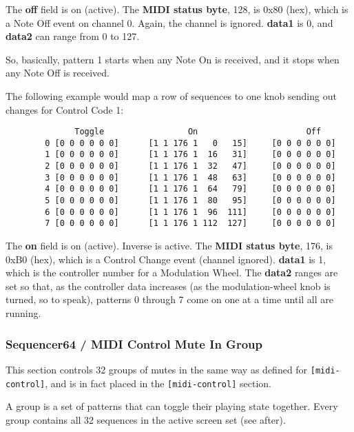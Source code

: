    The \textbf{off} field is on (active).  The \textbf{MIDI status byte},
   128, is 0x80 (hex), which is a Note Off event on channel 0.  Again, the
   channel is ignored.  \textbf{data1} is 0, and \textbf{data2} can range
   from 0 to 127.

   So, basically, pattern 1 starts when any Note On is received, and
   it stops when any Note Off is received.

   The following example would map a row of sequences to one knob sending
   out changes for Control Code 1:

   \begin{verbatim}
	          Toggle                 On                      Off
        0 [0 0 0 0 0 0]      [1 1 176 1   0   15]     [0 0 0 0 0 0]
        1 [0 0 0 0 0 0]      [1 1 176 1  16   31]     [0 0 0 0 0 0]
        2 [0 0 0 0 0 0]      [1 1 176 1  32   47]     [0 0 0 0 0 0]
        3 [0 0 0 0 0 0]      [1 1 176 1  48   63]     [0 0 0 0 0 0]
        4 [0 0 0 0 0 0]      [1 1 176 1  64   79]     [0 0 0 0 0 0]
        5 [0 0 0 0 0 0]      [1 1 176 1  80   95]     [0 0 0 0 0 0]
        6 [0 0 0 0 0 0]      [1 1 176 1  96  111]     [0 0 0 0 0 0]
        7 [0 0 0 0 0 0]      [1 1 176 1 112  127]     [0 0 0 0 0 0]
   \end{verbatim}

   The \textbf{on} field is on (active).  Inverse is active.  The
   \textbf{MIDI status byte}, 176, is 0xB0 (hex), which is a Control Change
   event (channel ignored).  \textbf{data1} is 1, which is the controller
   number for a Modulation Wheel.  The \textbf{data2} ranges are set so
   that, as the controller data increases (as the modulation-wheel knob is
   turned, so to speak), patterns 0 through 7 come on one at a time until
   all are running.

\subsubsection{Sequencer64 / MIDI Control Mute In Group}
\label{subsubsec:seq64_rc_file_midi_control_mute_in_group}

   This section controls 32 groups of mutes in the same way as 
	defined for \texttt{[midi-control]}, and is in fact placed in the
   \texttt{[midi-control]} section.

   A group is a set of patterns that can toggle their playing state
   together.  Every group contains all 32 sequences in the active screen set
   (see after).

